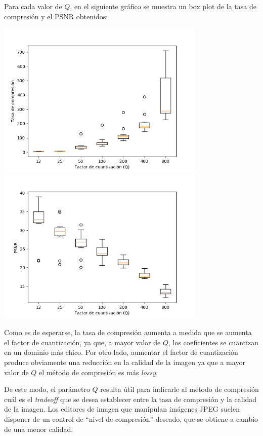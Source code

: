 \documentclass{article}
\begin{document}
Para cada valor de $Q$, en el siguiente gráfico se muestra un
box plot de la tasa de compresión y el PSNR obtenidos:\\
\begin{center}
\includegraphics[width=10cm]{../imgs/output/gray_plots/q_rate.png}
\includegraphics[width=10cm]{../imgs/output/gray_plots/q_psnr.png}
\end{center}

Como es de esperarse, la tasa de compresión aumenta a medida que
se aumenta el factor de cuantización, ya que, a mayor valor de $Q$,
los coeficientes se cuantizan en un dominio más chico.
Por otro lado, aumentar el factor de cuantización produce obviamente
una reducción en la calidad de la imagen ya que a mayor valor de $Q$
el método de compresión es más {\em lossy}.

De este modo, el parámetro $Q$ resulta útil para indicarle al método
de compresión cuál es el {\em tradeoff} que se desea establecer entre
la tasa de compresión y la calidad de la imagen.
Los editores de imagen que manipulan imágenes JPEG suelen
disponer de un control de ``nivel de compresión'' deseado, que
se obtiene a cambio de una menor calidad.
\end{document}
